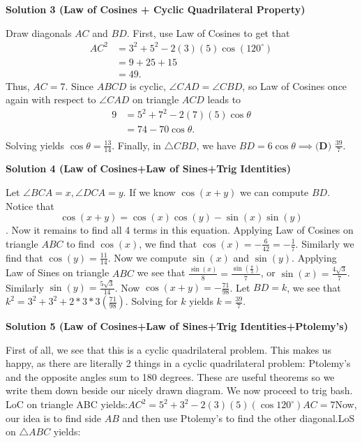 \begin{enumerate}
 



\textbf{Solution 3 (Law of Cosines + Cyclic Quadrilateral Property)}

Draw diagonals $AC$ and $BD$. First, use Law of Cosines to get that\begin{align*}AC^2&=3^2 + 5^2 - 2(3)(5)\cos(120^{\circ}) \\&= 9+25+15 \\&=49.\end{align*}
Thus, $AC=7$. Since $ABCD$ is cyclic, $\angle CAD = \angle CBD$, so Law of Cosines once again with respect to $\angle CAD$ on triangle $ACD$ leads to \begin{align*}9&=5^2+7^2-2(7)(5)\cos\theta \\&= 74-70\cos\theta. \\\end{align*}
Solving yields $\cos\theta=\frac{13}{14}$. Finally, in $\triangle CBD$, we have $BD=6\cos\theta \implies \boxed{\textbf{(D) }\frac{39}{7}}$.

 



\textbf{Solution 4 (Law of Cosines+Law of Sines+Trig Identities)}

Let $\angle BCA = x, \angle DCA = y$. If we know $\cos(x+y)$ we can compute $BD$. Notice that 
 \[\cos(x+y)=\cos(x)\cos(y)-\sin(x)\sin(y)\]. Now it remains to find all 4 terms in this equation. Applying Law of Cosines on triangle $ABC$ to find $\cos(x)$, we find that $\cos(x)=-\frac{6}{42}=-\frac{1}{7}$. Similarly we find that $\cos(y)=\frac{11}{14}$. Now we compute $\sin(x)$ and $\sin(y)$. Applying Law of Sines on triangle $ABC$ we see that $\frac{\sin(x)}{8}=\frac{\sin(\frac{\pi}{3})}{7}$, or $\sin(x)=\frac{4\sqrt{3}}{7}$. Similarly $\sin(y)=\frac{5\sqrt{3}}{14}$. Now $\cos(x+y)=-\frac{71}{98}$. Let $BD=k$, we see that $k^2=3^2+3^2+2*3*3(\frac{71}{98})$. Solving for $k$ yields $k=\frac{39}{7}$.

 


 



\textbf{Solution 5 (Law of Cosines+Law of Sines+Trig Identities+Ptolemy's)}

First of all, we see that this is a cyclic quadrilateral problem. This makes us happy, as there are literally 2 things in a cyclic quadrilateral problem: Ptolemy's and the opposite angles sum to 180 degrees. These are useful theorems so we write them down beside our nicely drawn diagram. We now proceed to trig bash. LoC on triangle ABC yields:$AC^2 = 5^2 + 3^2 - 2(3)(5)(\cos 120^\circ)$$AC = 7$Now, our idea is to find side $AB$ and then use Ptolemy's to find the other diagonal.LoS on $\triangle{ABC}$ yields:


\end{enumerate}
